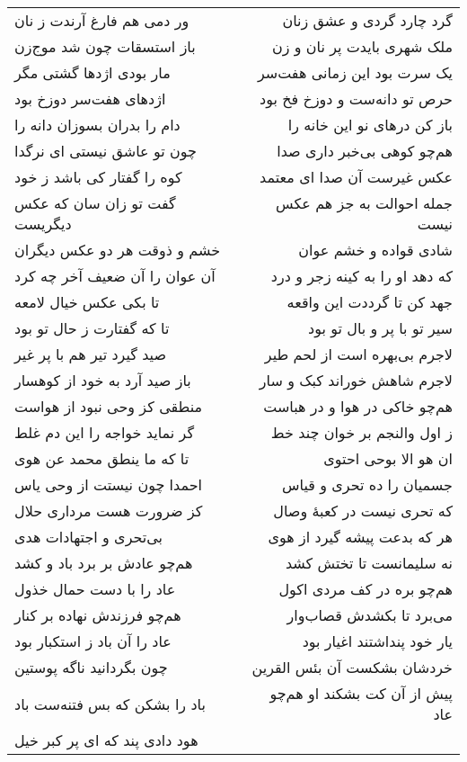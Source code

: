 \begin{center}
\begin{longtable}{l p{0.5cm} r}
ور دمی هم فارغ آرندت ز نان
&&
گرد چارد گردی و عشق زنان
\\
باز استسقات چون شد موج‌زن
&&
ملک شهری بایدت پر نان و زن
\\
مار بودی اژدها گشتی مگر
&&
یک سرت بود این زمانی هفت‌سر
\\
اژدهای هفت‌سر دوزخ بود
&&
حرص تو دانه‌ست و دوزخ فخ بود
\\
دام را بدران بسوزان دانه را
&&
باز کن درهای نو این خانه را
\\
چون تو عاشق نیستی ای نرگدا
&&
هم‌چو کوهی بی‌خبر داری صدا
\\
کوه را گفتار کی باشد ز خود
&&
عکس غیرست آن صدا ای معتمد
\\
گفت تو زان سان که عکس دیگریست
&&
جمله احوالت به جز هم عکس نیست
\\
خشم و ذوقت هر دو عکس دیگران
&&
شادی قواده و خشم عوان
\\
آن عوان را آن ضعیف آخر چه کرد
&&
که دهد او را به کینه زجر و درد
\\
تا بکی عکس خیال لامعه
&&
جهد کن تا گرددت این واقعه
\\
تا که گفتارت ز حال تو بود
&&
سیر تو با پر و بال تو بود
\\
صید گیرد تیر هم با پر غیر
&&
لاجرم بی‌بهره است از لحم طیر
\\
باز صید آرد به خود از کوهسار
&&
لاجرم شاهش خوراند کبک و سار
\\
منطقی کز وحی نبود از هواست
&&
هم‌چو خاکی در هوا و در هباست
\\
گر نماید خواجه را این دم غلط
&&
ز اول والنجم بر خوان چند خط
\\
تا که ما ینطق محمد عن هوی
&&
ان هو الا بوحی احتوی
\\
احمدا چون نیستت از وحی یاس
&&
جسمیان را ده تحری و قیاس
\\
کز ضرورت هست مرداری حلال
&&
که تحری نیست در کعبهٔ وصال
\\
بی‌تحری و اجتهادات هدی
&&
هر که بدعت پیشه گیرد از هوی
\\
هم‌چو عادش بر برد باد و کشد
&&
نه سلیمانست تا تختش کشد
\\
عاد را با دست حمال خذول
&&
هم‌چو بره در کف مردی اکول
\\
هم‌چو فرزندش نهاده بر کنار
&&
می‌برد تا بکشدش قصاب‌وار
\\
عاد را آن باد ز استکبار بود
&&
یار خود پنداشتند اغیار بود
\\
چون بگردانید ناگه پوستین
&&
خردشان بشکست آن بئس القرین
\\
باد را بشکن که بس فتنه‌ست باد
&&
پیش از آن کت بشکند او هم‌چو عاد
\\
هود دادی پند که ای پر کبر خیل

\end{longtable}
\end{center}
